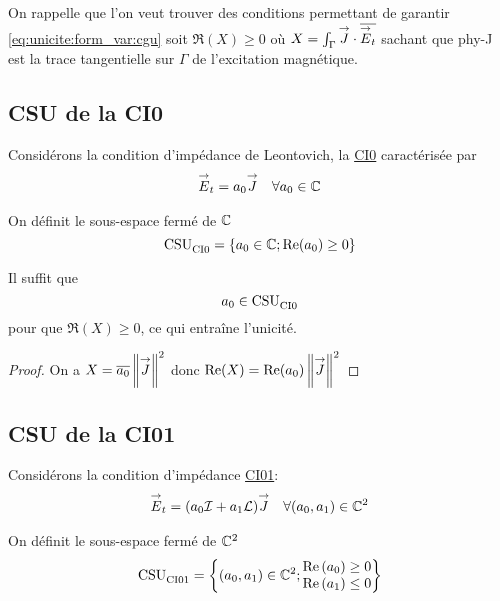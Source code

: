   On rappelle que l'on veut trouver des conditions permettant de garantir \eqref{eq:unicite:form_var:cgu} soit \(\Re(X)\ge0\) où \(X = \int_\Gamma {\overset{\rightarrow}{J}} \cdot {\overline{{\overset{\rightarrow}{E}}_t}}\) sachant que \gls{phy-J} est la trace tangentielle sur \(\Gamma\) de l’excitation magnétique.

  \subsection{CSU de la CI0}
    Considérons la condition d’impédance de Leontovich, la \hyperlink{ci0}{CI0} caractérisée par
    \begin{align}
      \label{eq:unicite:ci0}
      {\overset{\rightarrow}{E}}_t = a_0 {\overset{\rightarrow}{J}} && \forall a_0 \in \mathbb C
    \end{align}

    \begin{defn}
      \label{def:csu:ci0}
      On définit le sous-espace fermé de \(\mathbb C\)
      \begin{equation*}
        \operatorname{CSU}_{\operatorname{CI0}}^{{}} = \lbrace a_0 \in \mathbb C; \operatorname{Re}(a_0) \ge 0 \rbrace
      \end{equation*}
    \end{defn}

    \begin{prop}
      \label{prop:csu:ci0}
      Il suffit que
      \begin{equation*}
        a_0 \in \operatorname{CSU}_{\operatorname{CI0}}^{{}}
      \end{equation*}
      pour que \(\Re(X)\ge 0\), ce qui entraîne l'unicité.
    \end{prop}
    \begin{proof}
      On a \( X = {\overline{a_0}}\left\lVert{\overset{\rightarrow}{J}}\right\rVert^2\) donc \(\operatorname{Re}(X) = \operatorname{Re}(a_0)\left\lVert{\overset{\rightarrow}{J}}\right\rVert^2 \)
    \end{proof}
  \subsection{CSU de la CI01}
    Considérons la condition d’impédance \hyperlink{ci01}{CI01}:
    \begin{align}
      \label{eq:unicite:ci01}
      {\overset{\rightarrow}{E}}_t = (a_0{\mathcal{I}} + a_1 \mathcal{L}){\overset{\rightarrow}{J}} && \forall (a_0, a_1) \in \mathbb C^2
    \end{align}

    \begin{defn}
      \label{def:csu:ci01}
      On définit le sous-espace fermé de \(\mathbb C^2\)
      \begin{equation*}
        \operatorname{CSU}_{\operatorname{CI01}}^{{}} = \left\lbrace (a_0,a_1) \in \mathbb C^2; \begin{matrix}
        \operatorname{Re}\left(a_0\right) \ge 0
        \\
        \operatorname{Re}\left(a_1\right) \le 0
        \end{matrix}
        \right\rbrace
      \end{equation*}
    \end{defn}

